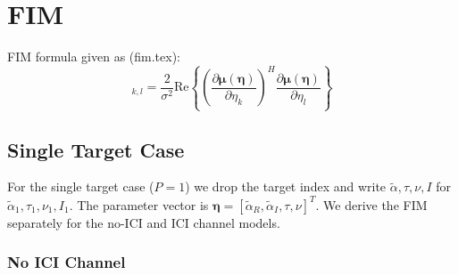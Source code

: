 \documentclass[11pt]{article}
\begin{document}
\section{FIM}
FIM formula given as (fim.tex):
\begin{equation}
[\bm{J}(\bm{\eta})]_{k,l} = \frac{2}{\sigma^2} \text{Re}\left\{ \left(\frac{\partial \bm{\mu}(\bm{\eta})}{\partial \eta_k}\right)^H \frac{\partial \bm{\mu}(\bm{\eta})}{\partial \eta_l} \right\}
\end{equation}

\subsection{Single Target Case}

For the single target case (\(P=1\)) we drop the target index and write \(\tilde{\alpha}, \tau, \nu, I\) for \(\tilde{\alpha}_1, \tau_1, \nu_1, I_1\). The parameter vector is \(\bm{\eta} = [\tilde{\alpha}_R, \tilde{\alpha}_I, \tau, \nu]^T\). We derive the FIM separately for the no-ICI and ICI channel models.

\subsubsection{No ICI Channel}
\end{document}
